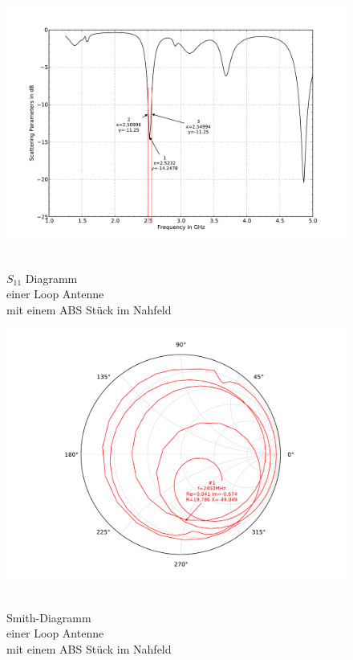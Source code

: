 \begin{figure}[!h]
\begin{center}
  \includegraphics[width=\linewidth]{content/bilder/Evaluation/Loop/mit1ABS/S11_Loop_Coil_1ABS.pdf}
  \caption{\\$S_{11}$ Diagramm \\einer Loop Antenne \\mit einem ABS Stück im Nahfeld}\label{fig:S11_Loop_1ABS_3}
\endminipage%
{}
  \includegraphics[width=\linewidth]{content/bilder/Evaluation/Loop/mit1ABS/Smith_Loop_Coil_1ABS.pdf}
  \caption{\\Smith-Diagramm \\einer Loop Antenne \\ mit einem ABS Stück im Nahfeld}\label{fig:Smith_Loop_1ABS_4}
\endminipage
\end{center}
\end{figure}

